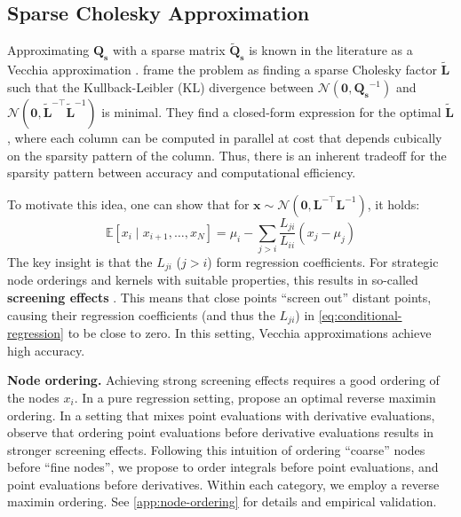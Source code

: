 \documentclass{article}
\theoremstyle{plain}
\theoremstyle{definition}
\theoremstyle{remark}
\newcommand{\E}{\mathbb{E}}
\begin{document}
\subsection{Sparse Cholesky Approximation}
\label{sec:kl-cholesky}

Approximating $\bm{Q_s}$ with a sparse matrix $\bm{\tilde{Q}_s}$ is known in the literature as a Vecchia approximation \citep{katzfussGeneralFrameworkVecchia2021a}.
\citet{schaferSparseCholeskyFactorization2021a} frame the problem as finding a sparse Cholesky factor $\bm{\tilde{L}}$ such that the Kullback-Leibler (KL) divergence between $\mathcal{N}(\bm{0}, \bm{Q_s}^{-1})$ and $\mathcal{N}(\bm{0}, \bm{\tilde{L}}^{-\top} \bm{\tilde{L}}^{-1})$ is minimal.
They find a closed-form expression for the optimal $\bm{\tilde{L}}$, where each column can be computed in parallel at cost that depends cubically on the sparsity pattern of the column.
Thus, there is an inherent tradeoff for the sparsity pattern between accuracy and computational efficiency.

To motivate this idea, one can show that for $\bm{x} \sim \mathcal{N}(\bm{0}, \bm{L}^{-\top} \bm{L}^{-1})$, it holds:
\begin{equation}
  \E[x_i \mid x_{i+1}, \dots, x_N] = \mu_i - \sum_{j > i} \frac{L_{ji}}{L_{ii}} (x_j - \mu_j)
  \label{eq:conditional-regression}
\end{equation}
The key insight is that the $L_{ji}$ ($j > i$) form regression coefficients.
For strategic node orderings and kernels with suitable properties, this results in so-called \textbf{screening effects} \citep{steinWhenDoesScreening2011}.
This means that close points ``screen out'' distant points, causing their regression coefficients (and thus the $L_{ji}$) in \cref{eq:conditional-regression} to be close to zero.
In this setting, Vecchia approximations achieve high accuracy.

\textbf{Node ordering.} Achieving strong screening effects requires a good ordering of the nodes $x_i$.
In a pure regression setting, \citet{schaferSparseCholeskyFactorization2021a} propose an optimal reverse maximin ordering.
In a setting that mixes point evaluations with derivative evaluations, \citet{chenSparseCholeskyFactorization2025} observe that ordering point evaluations before derivative evaluations results in stronger screening effects.
Following this intuition of ordering ``coarse'' nodes before ``fine nodes'', we propose to order integrals before point evaluations, and point evaluations before derivatives.
Within each category, we employ a reverse maximin ordering.
See \cref{app:node-ordering} for details and empirical validation.
\end{document}

